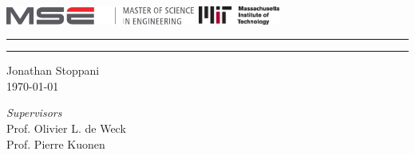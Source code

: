 \begin{titlepage}
\AddToShipoutPicture*{\BackgroundPic}
\thispagestyle{empty}

\vspace*{1mm}
\includegraphics[height=6mm]{images/logo_mse}
\hfill
\includegraphics[height=6mm]{images/logo-mit}
\vspace{5mm}

\newsavebox{\maintitle}
\savebox{\maintitle}{\Huge\justifying\doctitle\par}

\newlength{\titlew}
\settowidth{\titlew}{\usebox{\maintitle}}


\hrule
\vspace{0.2mm}
{\Huge\justifying\doctitle\linebreak\par}
\vspace{-5.5mm}
\hrule
\hspace{0.6mm}\begin{minipage}[t]{0.993\textwidth}
\end{minipage}
\vspace{5mm}
\vfill

Jonathan Stoppani\\[1.5mm]
\today

\vfill

\emph{Supervisors}\\[2mm]
Prof. Olivier L. de Weck\\[1.5mm]
Prof. Pierre Kuonen

\vspace{115mm}
\end{titlepage}
